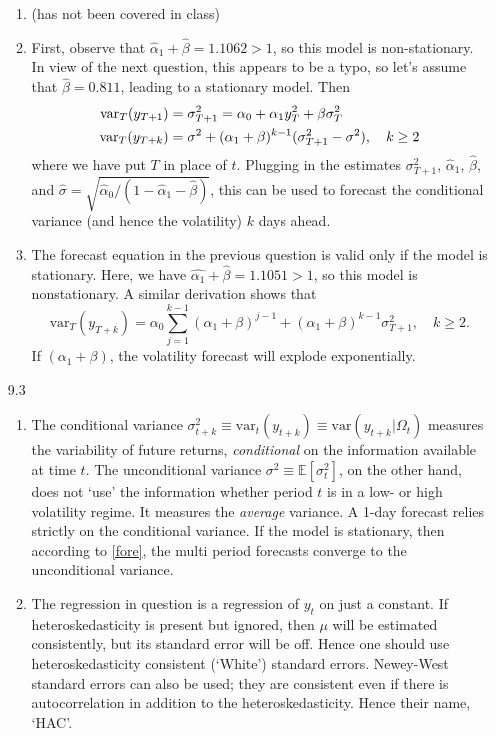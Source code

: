 \documentclass[11pt,a4paper]{article}
\begin{document}
\begin{enumerate}
\begin{enumerate}
\item (has not been covered in class)
\item First, observe that $\hat{\alpha}_1+\hat{\beta}=1.1062>1$, so this model is non-stationary. In view of the next question, this appears to be a typo, so let's assume that $\hat{\beta}=0.811$, leading to a stationary model. Then
    \begin{align}
    \text{var}_{T}(y_{T+1})&=\sigma _{T+1}^{2}=\alpha_0+\alpha_1y_{T}^{2}+\beta \sigma _{T}^{2}\notag\\
    \text{var}_{T}(y_{T+k})&=\sigma
^{2}+(\alpha_1 +\beta )^{k-1}(\sigma _{T+1}^{2}-\sigma ^{2}),\quad k\geq 2\label{fore}
\end{align}
where we have put $T$ in place of $t$. Plugging in the estimates $\sigma _{T+1}^{2}$, $\hat{\alpha}_1$, $\hat{\beta}$, and $\hat{\sigma}=\sqrt{\hat{\alpha}_0/(1-\hat{\alpha}_1-\hat{\beta})}$, this can be used to forecast the conditional variance (and hence the volatility) $k$ days ahead.
\item  The forecast equation in the previous question is valid only if the model is stationary. Here, we have $\hat{\alpha_1}+\hat{\beta}=1.1051>1$, so this model is nonstationary. A similar derivation shows that
  \[\text{var}_{T}(y_{T+k})=\alpha_0\sum_{j=1}^{k-1}(\alpha_1+\beta)^{j-1}+(\alpha_1 +\beta )^{k-1}\sigma _{T+1}^{2}, \quad k\geq 2.
\]
If $(\alpha_1 +\beta )$, the volatility forecast will explode exponentially.
\end{enumerate}
\item[9.3]
\begin{enumerate}
\item The conditional variance $\sigma^2_{t+k}\equiv\mathrm{var}_t(y_{t+k})\equiv\mathrm{var}(y_{t+k}|\Omega_t)$ measures the variability of future returns, \emph{conditional} on the information available at time $t$. The unconditional variance $\sigma^2\equiv\mathbb{E}[\sigma^2_t]$, on the other hand, does not `use' the information whether period $t$ is in a low- or high volatility regime. It measures the \emph{average} variance.
A 1-day forecast relies strictly on the conditional variance. If the model is stationary, then according to \eqref{fore}, the multi period forecasts converge to the unconditional variance.
\item The regression in question is a regression of $y_t$ on just a constant. If heteroskedasticity is present but ignored, then $\mu$ will be estimated consistently, but its standard error will be off. Hence one should use heteroskedasticity consistent (`White') standard errors. Newey-West standard errors can also be used; they are consistent even if there is autocorrelation in addition to the heteroskedasticity. Hence their name, `HAC'.

\end{enumerate}
\end{enumerate}
\end{document}
